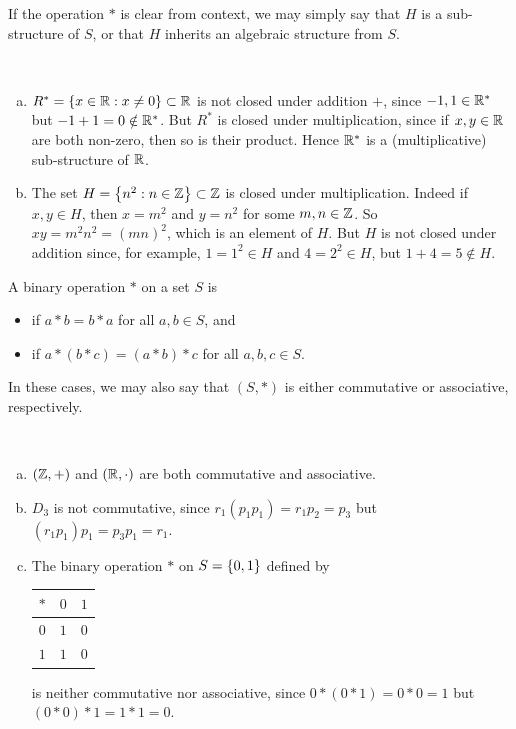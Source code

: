 \documentclass[11pt,fleqn,dvipsnames,usenames]{article}
\newcommand{\p}{\noindent}
\begin{document}
%
\terminology If the operation $*$ is clear from context, we may simply say that $H$ is a sub-structure of $S$, or that $H$ inherits an algebraic structure from $S$.
%
\begin{examples}~
\begin{enumerate}[(a)]
\item $R^{*} = \left\{x\in\mathbb{R}:x\neq 0\right\}\subset \mathbb{R}$ is not closed under addition $+$, since $-1,1\in\mathbb{R}^{*}$ but $-1 + 1 = 0\notin \mathbb{R}^{*}$.  But $R^{*}$ is closed under multiplication, since if $x,y\in\mathbb{R}$ are both non-zero, then so is their product.  Hence $\mathbb{R}^{*}$ is a (multiplicative) sub-structure of $\mathbb{R}$.
\item The set $H = \left\{n^2:n\in\mathbb{Z}\right\}\subset\mathbb{Z}$ is closed under multiplication.  Indeed if $x,y\in H$, then $x = m^2$ and $y=n^2$ for some $m,n\in\mathbb{Z}$.  So $xy = m^2n^2 = (mn)^2$, which is an element of $H$.  But $H$ is not closed under addition since, for example, $1 = 1^2\in H$ and $4 = 2^2\in H$, but $1 + 4 = 5\notin H$.
\end{enumerate}
\end{examples}
%
\begin{definition}
A binary operation $*$ on a set $S$ is
\begin{itemize}
\item {} if $a*b = b*a$ for all $a,b\in S$, and
\item {} if $a*(b*c) = (a*b)*c$ for all $a,b,c\in S$.
\end{itemize}
\p In these cases, we may also say that $(S,*)$ is either commutative or associative, respectively.
\end{definition}
%
\begin{examples}~
\begin{enumerate}[(a)]
\item $(\mathbb{Z},+)$ and $(\mathbb{R},\cdot)$ are both commutative and associative.
\item $D_3$ is not commutative, since $r_1(p_1p_1) = r_1p_2 = p_3$ but $(r_1p_1)p_1 = p_3p_1 = r_1$.
\item The binary operation $*$ on $S = \left\{0,1\right\}$ defined by 
\begin{center}
\def\arraystretch{1.5}
\begin{tabular}{c|cc}
$*$ & $0$ & $1$\\
\hline
$0$ & $1$ & $0$\\
$1$ & $1$ & $0$
\end{tabular}
\end{center}
\p is neither commutative nor associative, since $0*(0*1) = 0*0=1$ but $(0*0)*1 = 1*1=0$.
\end{enumerate}
\end{examples}
%
\end{document}
